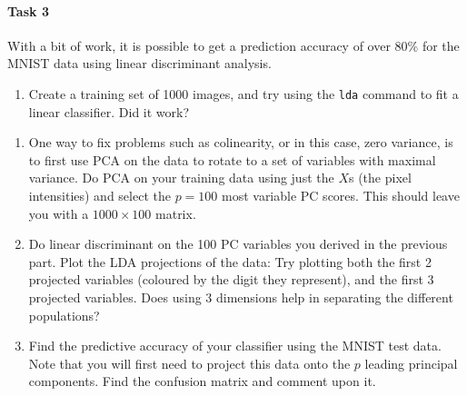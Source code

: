 \documentclass[
]{book}
\newenvironment{Shaded}{\begin{snugshade}}{\end{snugshade}}
\newcommand{\DecValTok}[1]{\textcolor[rgb]{0.00,0.00,0.81}{#1}}
\newcommand{\FunctionTok}[1]{\textcolor[rgb]{0.13,0.29,0.53}{\textbf{#1}}}
\newcommand{\NormalTok}[1]{#1}
\newcommand{\OtherTok}[1]{\textcolor[rgb]{0.56,0.35,0.01}{#1}}
\newcommand{\SpecialCharTok}[1]{\textcolor[rgb]{0.81,0.36,0.00}{\textbf{#1}}}
\newcommand{\StringTok}[1]{\textcolor[rgb]{0.31,0.60,0.02}{#1}}
\providecommand{\tightlist}{%
  \setlength{\itemsep}{0pt}\setlength{\parskip}{0pt}}
\theoremstyle{definition}
\theoremstyle{definition}
\theoremstyle{definition}
\theoremstyle{definition}
\theoremstyle{remark}
\begin{document}
\paragraph*{Task 3}\label{task-3-3}

With a bit of work, it is possible to get a prediction accuracy of over 80\% for the MNIST data using linear discriminant analysis.

\begin{enumerate}
\def\labelenumi{\roman{enumi}.}
\tightlist
\item
  Create a training set of 1000 images, and try using the \texttt{lda} command to fit a linear classifier. Did it work?
\end{enumerate}

\begin{Shaded}
\end{Shaded}

\begin{enumerate}
\def\labelenumi{\roman{enumi}.}
\setcounter{enumi}{1}
\item
  One way to fix problems such as colinearity, or in this case, zero variance, is to first use PCA on the data to rotate to a set of variables with maximal variance. Do PCA on your training data using just the \(X\)s (the pixel intensities) and select the \(p=100\) most variable PC scores. This should leave you with a \(1000 \times 100\) matrix.
\item
  Do linear discriminant on the 100 PC variables you derived in the previous part. Plot the LDA projections of the data: Try plotting both the first 2 projected variables (coloured by the digit they represent), and the first 3 projected variables.
  Does using 3 dimensions help in separating the different populations?
\item
  Find the predictive accuracy of your classifier using the MNIST test data. Note that you will first need to project this data onto the \(p\) leading principal components. Find the confusion matrix and comment upon it.
\end{enumerate}
\end{document}
